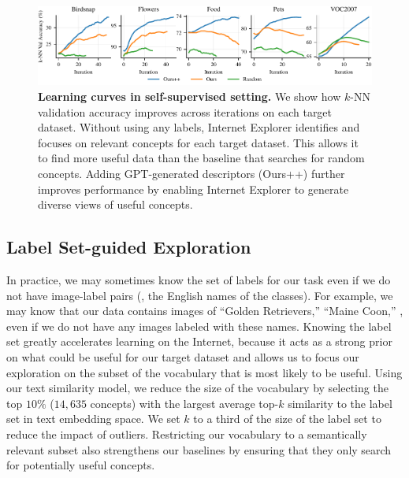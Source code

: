 \begin{figure}[t]
    \centering
    \includegraphics[width=\linewidth]{figures/ssl-curves-updated.pdf}
    \caption{\textbf{Learning curves in self-supervised setting.} We show how $k$-NN validation accuracy improves across iterations on each target dataset. Without using any labels, Internet Explorer identifies and focuses on relevant concepts for each target dataset. This allows it to find more useful data than the baseline that searches for random concepts. Adding GPT-generated descriptors (Ours++) further improves performance by enabling Internet Explorer to generate diverse views of useful concepts. 
    } 
    \label{fig:learning_curves}
\end{figure}

\subsection{Label Set-guided Exploration}
In practice, we may sometimes know the set of labels for our task even if we do not have image-label pairs (\ie, the English names of the classes).
For example, we may know that our data contains images of ``Golden Retrievers,'' ``Maine Coon,'' \etc, even if we do not have any images labeled with these names.
Knowing the label set greatly accelerates learning on the Internet, because it acts as a strong prior on what could be useful for our target dataset and allows us to focus our exploration on the subset of the vocabulary that is most likely to be useful.
Using our text similarity model, we reduce the size of the vocabulary by selecting the top 
$10\%$ ($14{,}635$ concepts)
with the largest average top-$k$ similarity to the label set in text embedding space. We set $k$ to a third of the size of the label set to reduce the impact of outliers.
Restricting our vocabulary to a semantically relevant subset also strengthens our baselines by ensuring that they only search for potentially useful concepts.

